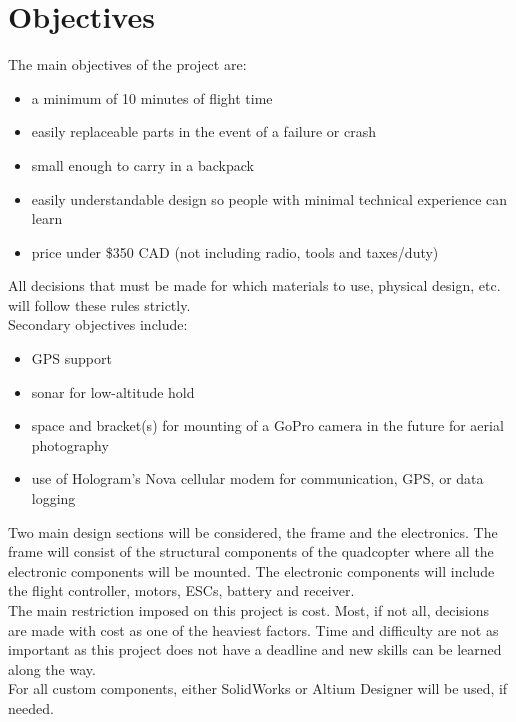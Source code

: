 \documentclass[12pt]{article}
\begin{document}
\section{Objectives}

The main objectives of the project are:
\renewcommand{\labelitemi}{\textperiodcentered}
\begin{itemize}
\item a minimum of 10 minutes of flight time
\item easily replaceable parts in the event of a failure or crash
\item small enough to carry in a backpack
\item easily understandable design so people with minimal technical experience can learn
\item price under \$350 CAD (not including radio, tools and taxes/duty)
\end{itemize}

All decisions that must be made for which materials to use, physical design, etc. will follow these rules strictly.
\\

Secondary objectives include:
\renewcommand{\labelitemi}{\textperiodcentered}
\begin{itemize}
\item GPS support
\item sonar for low-altitude hold
\item space and bracket(s) for mounting of a GoPro camera in the future for aerial photography
\item use of Hologram's Nova cellular modem for communication, GPS, or data logging
\end{itemize}

Two main design sections will be considered, the frame and the electronics. The frame will consist of the structural components of the quadcopter where all the electronic components will be mounted. The electronic components will include the flight controller, motors, ESCs, battery and receiver. 
\\

The main restriction imposed on this project is cost. Most, if not all, decisions are made with cost as one of the heaviest factors. Time and difficulty are not as important as this project does not have a deadline and new skills can be learned along the way.
\\

For all custom components, either SolidWorks or Altium Designer will be used, if needed.
\end{document}
